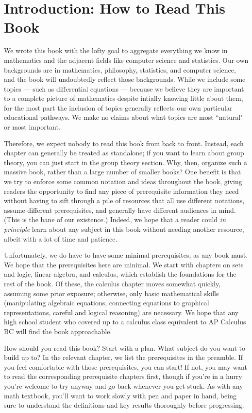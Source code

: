 \documentclass[../../../main.tex]{subfiles}
\begin{document}
\section{Introduction: How to Read This Book}

We wrote this book with the lofty goal to aggregate everything we know in mathematics and the adjacent fields like computer science and statistics. Our own backgrounds are in mathematics, philosophy, statistics, and computer science, and the book will undoubtedly reflect those backgrounds. While we include some topics --- such as differential equations --- because we believe they are important to a complete picture of mathematics despite intially knowing little about them, for the most part the inclusion of topics generally reflects our own particular educational pathways. We make no claims about what topics are most ``natural" or most important. 

Therefore, we expect nobody to read this book from back to front. Instead, each chapter can generally be treated as standalone; if you want to learn about group theory, you can just start in the group theory section. Why, then, organize such a massive book, rather than a large number of smaller books? One benefit is that we try to enforce some common notation and ideas throughout the book, giving readers the opportunity to find any piece of prerequisite information they need without having to sift through a pile of resources that all use different notations, assume different prerequisites, and generally have different audiences in mind. (This is the bane of our existence.) Indeed, we hope that a reader could \textit{in principle} learn about any subject in this book without needing another resource, albeit with a lot of time and patience. 

Unfortunately, we do have to have some minimal prerequisites, as any book must. We hope that the prerequisites here are minimal. We start with  chapters on sets and logic, linear algebra, and calculus, which establish the foundations for the rest of the book. Of these, the calculus chapter moves somewhat quickly, assuming some prior exposure; otherwise, only basic mathematical skills (manipulating algebraic equations, connecting equations to graphical representations, careful and logical reasoning) are necessary. We hope that any high school student who covered up to a calculus class equivalent to AP Calculus BC will find the book approachable. 

How should you read this book? Start with a plan. What subject do you want to build up to? In the relevant chapter, we list the prerequisites in the preamble. If you feel comfortable with those prerequisites, you can start! If not, you may want to read the corresponding prerequisite chapters first, though if you're in a hurry you're welcome to try anyway and go back whenever you get stuck. As with any math textbook, you'll want to work slowly with pen and paper in hand, being sure to understand the definitions and key results thoroughly before progressing. 
\end{document}
